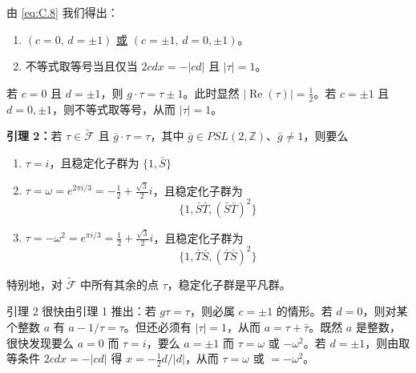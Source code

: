 由 \eqref{eq:C.8} 我们得出：

\begin{enumerate}
  \item $(c=0,\,d=\pm1)$ \underline{或} $(c=\pm1,\,d=0,\pm1)$。
  \item 不等式取等号当且仅当 $2cdx=-|cd|$ 且 $|\tau|=1$。
\end{enumerate}

若 $c=0$ 且 $d=\pm1$，则 $g\cdot\tau=\tau\pm1$。此时显然 $|\operatorname{Re}(\tau)|=\frac{1}{2}$。若 $c=\pm1$ 且 $d=0,\pm1$，则不等式取等号，从而 $|\tau|=1$。

\textbf{引理 2：}若 $\tau\in\tilde{\mathcal{F}}$ 且 $\bar g\cdot\tau=\tau$，其中 $\bar g\in PSL(2,\mathbb{Z})$、$\bar g\ne1$，则要么
\begin{enumerate}
  \item $\tau=i$，且稳定化子群为 $\{1,\bar S\}$
  \item $\tau=\omega=e^{2\pi i/3}=-\frac{1}{2}+\frac{\sqrt{3}}{2}i$，且稳定化子群为
  \begin{equation}
    \{1,\bar S\bar T,(\bar S\bar T)^2\}
    \tag{C.9}
    \label{eq:C.9}
  \end{equation}
  \item $\tau=-\omega^2=e^{\pi i/3}=\frac{1}{2}+\frac{\sqrt{3}}{2}i$，且稳定化子群为
  \begin{equation}
    \{1,\bar T\bar S,(\bar T\bar S)^2\}
    \tag{C.10}
    \label{eq:C.10}
  \end{equation}
\end{enumerate}

特别地，对 $\tilde{\mathcal{F}}$ 中所有其余的点 $\tau$，稳定化子群是平凡群。

引理 2 很快由引理 1 推出：若 $g\tau=\tau$，则必属 $c=\pm1$ 的情形。若 $d=0$，则对某个整数 $a$ 有 $a-1/\tau=\tau$。但还必须有 $|\tau|=1$，从而 $a=\tau+\bar\tau$。既然 $a$ 是整数，很快发现要么 $a=0$ 而 $\tau=i$，要么 $a=\pm1$ 而 $\tau=\omega$ 或 $-\omega^2$。若 $d=\pm1$，则由取等条件 $2cdx=-|cd|$ 得 $x=-\frac{1}{2}d/|d|$，从而 $\tau=\omega$ 或 $=-\omega^2$。

